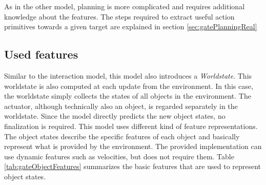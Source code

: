 As in the other model, planning is more complicated and requires additional knowledge about the features. The steps required to extract useful action primitives towards a given target are explained in section \ref{sec:gatePlanningReal}


%
%
%


\subsection{Used features \label{sec:gateFeatures}}

Similar to the interaction model, this model also introduces a \textit{Worldstate}. This worldstate is also computed at each update from the environment. In this case, the worldstate simply collects the states of all objects in the environment. The actuator, although technically also an object, is regarded separately in the worldstate. Since the model directly predicts the new object states, no finalization is required. 
This model uses different kind of feature representations. The object states describe the specific features of each object and basically represent what is provided by the environment. The provided implementation can use dynamic features such as velocities, but does not require them. Table \ref{tab:gateObjectFeatures} summarizes the basic features that are used to represent object states.

